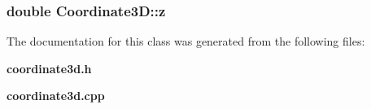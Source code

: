 \subsubsection{\setlength{\rightskip}{0pt plus 5cm}double Coordinate3D::z\hspace{0.3cm}{\tt  [protected]}}\label{classCoordinate3D_n2}




The documentation for this class was generated from the following files:\begin{CompactItemize}
\item 
{\bf coordinate3d.h}\item 
{\bf coordinate3d.cpp}\end{CompactItemize}
